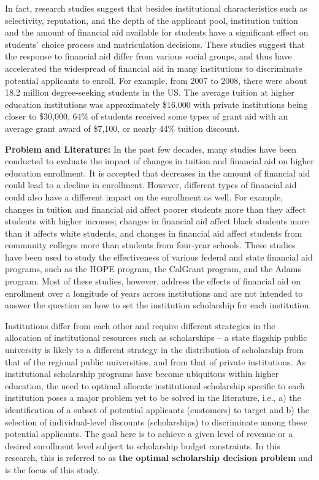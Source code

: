 \documentclass[12pt,english]{report}
\begin{document}
In fact, research studies suggest that besides institutional characteristics
such as selectivity, reputation, and the depth of the applicant pool,
institution tuition and the amount of financial aid available for students have
a significant effect on students' choice process and matriculation decisions.
These studies suggest that the response to financial aid differ from various
social groups, and thus have accelerated the widespread of financial aid in
many institutions to discriminate potential applicants to enroll.  For example,
from 2007 to 2008, there were about 18.2 million degree-seeking students in 
the US. The average tuition at higher education institutions was approximately
\$16,000 with private institutions being closer to \$30,000, 64\% of students
received some types of grant aid with an average grant award of \$7,100, or 
nearly 44\% tuition discount.

\vspace*{.15in} 
\noindent \textbf{Problem and Literature:}
In the past few decades, many studies have been conducted to evaluate the
impact of changes in tuition and financial aid on higher education enrollment.
It is accepted that decreases in the amount of financial aid could lead to a
decline in enrollment. However, different types of financial aid could also
have a different impact on the enrollment as well. For example, changes in
tuition and financial aid affect poorer students more than they affect students
with higher incomes; changes in financial aid affect black students more than
it affects white students, and changes in financial aid affect students from
community colleges more than students from four-year schools. These studies
have been used to study the effectiveness of various federal and state
financial aid programs, such as the HOPE program, the CalGrant program, and the
Adams program.  Most of these studies, however, address the effects of
financial aid on enrollment over a longitude of years across institutions and
are not intended to answer the question on how to set the institution
scholarship for each institution. 

Institutions differ from each other and require different strategies in the
allocation of institutional resources such as scholarships --  a state flagship
public university is likely to a different strategy in the distribution of
scholarship from that of the regional public universities, and from that of
private institutions. As institutional scholarship programs have become
ubiquitous within higher education, the need to optimal allocate institutional
scholarship specific to each institution poses a major problem yet to be solved
in the literature, i.e., a) the identification of a subset of potential
applicants (customers) to target and b) the selection of individual-level
discounts (scholarships) to discriminate among these potential applicants.  The
goal here is to achieve a given level of revenue or a desired
enrollment level subject to scholarship budget constraints.  In this research,
this is referred to as \textbf{the optimal scholarship decision problem} and is
the focus of this study.
\end{document}
